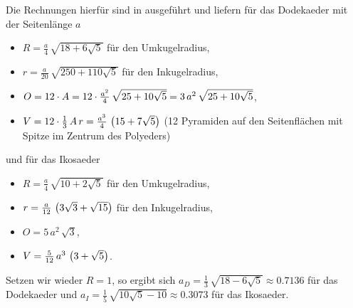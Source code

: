 \documentclass[11pt]{article}
\begin{document}
Die Rechnungen hierfür sind in \cite{Fendt1, Fendt2} ausgeführt und liefern
für das Dodekaeder mit der Seitenlänge $a$
\begin{itemize}
\item $R=\frac{a}{4}\,\sqrt{18+6\sqrt{5}}$ für den Umkugelradius,
\item $r=\frac{a}{20}\,\sqrt{250+110\sqrt{5}}$ für den Inkugelradius,
\item $O=12\cdot A=12\cdot\frac{a^2}{4}\,\sqrt{25+10\sqrt{5}}
  =3\,a^2\,\sqrt{25+10\sqrt{5}}$,
\item $V=12\cdot\frac13\,A\,r =\frac{a^3}{4}\,\left(15+7\sqrt{5}\right)$ (12 Pyramiden
  auf den Seitenflächen mit Spitze im Zentrum des Polyeders)
\end{itemize}
und für das Ikosaeder
\begin{itemize}
\item $R=\frac{a}{4}\,\sqrt{10+2\sqrt{5}}$ für den Umkugelradius,
\item $r=\frac{a}{12}\,\left(3\sqrt{3}+\sqrt{15}\right)$ für den Inkugelradius,
\item $O=5\,a^2\,\sqrt{3}$,
\item $V=\frac{5}{12}\,a^3\,\left(3+\sqrt{5}\right)$.
\end{itemize}
Setzen wir wieder $R=1$, so ergibt sich $a_D=\frac13\,\sqrt{18-6\sqrt{5}}
\approx 0.7136$ für das Dodekaeder und $a_I=\frac15\,\sqrt{10\sqrt{5}-10}
\approx 0.3073$ für das Ikosaeder. 




\end{document}
